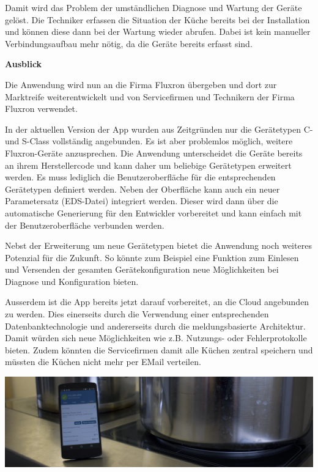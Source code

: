 Damit wird das Problem der umständlichen Diagnose und Wartung der Geräte gelöst. Die Techniker erfassen die Situation der Küche bereits bei der Installation und können diese dann bei der Wartung wieder abrufen. Dabei ist kein manueller Verbindungsaufbau mehr nötig, da die Geräte bereits erfasst sind.

\pagebreak

\textbf{Ausblick}

Die Anwendung wird nun an die Firma Fluxron übergeben und dort zur Marktreife weiterentwickelt und von Servicefirmen und Technikern der Firma Fluxron verwendet.

In der aktuellen Version der App wurden aus Zeitgründen nur die Gerätetypen C- und S-Class vollständig angebunden. Es ist aber problemlos möglich, weitere Fluxron-Geräte anzusprechen. Die Anwendung unterscheidet die Geräte bereits an ihrem Herstellercode und kann daher um beliebige Gerätetypen erweitert werden. Es muss lediglich die Benutzeroberfläche für die entsprechenden Gerätetypen definiert werden. Neben der Oberfläche kann auch ein neuer Parametersatz (EDS-Datei) integriert werden. Dieser wird dann über die automatische Generierung für den Entwickler vorbereitet und kann einfach mit der Benutzeroberfläche verbunden werden.

Nebst der Erweiterung um neue Gerätetypen bietet die Anwendung noch weiteres Potenzial für die Zukunft. So könnte zum Beispiel eine Funktion zum Einlesen und Versenden der gesamten Gerätekonfiguration neue Möglichkeiten bei Diagnose und Konfiguration bieten.

Ausserdem ist die App bereits jetzt darauf vorbereitet, an die Cloud angebunden zu werden. Dies einerseits durch die Verwendung einer entsprechenden Datenbanktechnologie und andererseits durch die meldungsbasierte Architektur. Damit würden sich neue Möglichkeiten wie z.B. Nutzungs- oder Fehlerprotokolle bieten. Zudem könnten die Servicefirmen damit alle Küchen zentral speichern und müssten die Küchen nicht mehr per EMail verteilen.

\vspace{1cm}

\includegraphics[trim={0 0 36 0},clip]{start/img/img_7670}